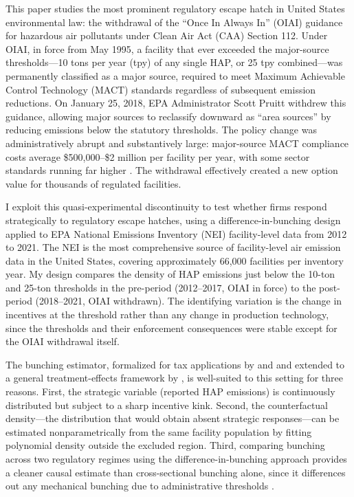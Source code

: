 \documentclass[12pt]{article}
\begin{document}
This paper studies the most prominent regulatory escape hatch in United States environmental law: the withdrawal of the ``Once In Always In'' (OIAI) guidance for hazardous air pollutants under Clean Air Act (CAA) Section 112. Under OIAI, in force from May 1995, a facility that ever exceeded the major-source thresholds---10 tons per year (tpy) of any single HAP, or 25 tpy combined---was permanently classified as a major source, required to meet Maximum Achievable Control Technology (MACT) standards regardless of subsequent emission reductions. On January 25, 2018, EPA Administrator Scott Pruitt withdrew this guidance, allowing major sources to reclassify downward as ``area sources'' by reducing emissions below the statutory thresholds. The policy change was administratively abrupt and substantively large: major-source MACT compliance costs average \$500,000--\$2 million per facility per year, with some sector standards running far higher \citep{EPA2019MACT}. The withdrawal effectively created a new option value for thousands of regulated facilities.

I exploit this quasi-experimental discontinuity to test whether firms respond strategically to regulatory escape hatches, using a difference-in-bunching design applied to EPA National Emissions Inventory (NEI) facility-level data from 2012 to 2021. The NEI is the most comprehensive source of facility-level air emission data in the United States, covering approximately 66,000 facilities per inventory year. My design compares the density of HAP emissions just below the 10-ton and 25-ton thresholds in the pre-period (2012--2017, OIAI in force) to the post-period (2018--2021, OIAI withdrawn). The identifying variation is the change in incentives at the threshold rather than any change in production technology, since the thresholds and their enforcement consequences were stable except for the OIAI withdrawal itself.

The bunching estimator, formalized for tax applications by \citet{Saez2010} and \citet{ChettyFriedmanOlsenPistaferri2011} and extended to a general treatment-effects framework by \citet{Kleven2016}, is well-suited to this setting for three reasons. First, the strategic variable (reported HAP emissions) is continuously distributed but subject to a sharp incentive kink. Second, the counterfactual density---the distribution that would obtain absent strategic responses---can be estimated nonparametrically from the same facility population by fitting polynomial density outside the excluded region. Third, comparing bunching across two regulatory regimes using the difference-in-bunching approach \citep{ChettyFriedmanSaez2013, Bastani_Selin2019} provides a cleaner causal estimate than cross-sectional bunching alone, since it differences out any mechanical bunching due to administrative thresholds \citep{NotowidigoRoth2021}.
\end{document}
